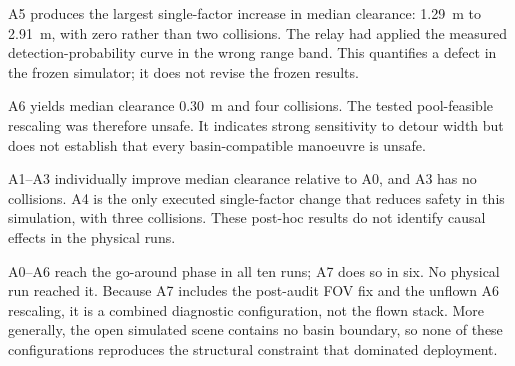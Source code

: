 

A5 produces the largest single-factor increase in median clearance:
\SI{1.29}{\metre} to \SI{2.91}{\metre}, with zero rather than two
collisions. The relay had applied the measured detection-probability
curve in the wrong range band. This quantifies a defect in the frozen
simulator; it does not revise the frozen results.

A6 yields median clearance \SI{0.30}{\metre} and four collisions. The
tested pool-feasible rescaling was therefore unsafe. It indicates strong
sensitivity to detour width but does not establish that every
basin-compatible manoeuvre is unsafe.

A1--A3 individually improve median clearance relative to A0, and A3 has
no collisions. A4 is the only executed single-factor change that reduces
safety in this simulation, with three collisions. These post-hoc results
do not identify causal effects in the physical runs.

A0--A6 reach the go-around phase in all ten runs; A7 does so in six.
No physical run reached it. Because A7 includes the post-audit FOV fix
and the unflown A6 rescaling, it is a combined diagnostic configuration,
not the flown stack. More generally, the open simulated scene contains
no basin boundary, so none of these configurations reproduces the
structural constraint that dominated deployment.

